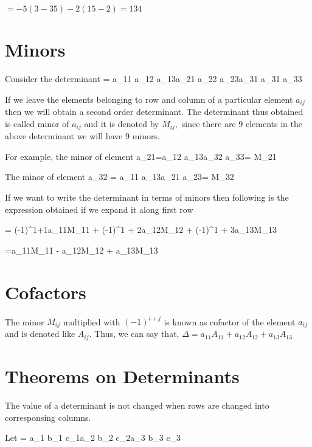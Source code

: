 $= -5(3 - 35) -2(15 -2) = 134$

\section{Minors}
Consider the determinant \startformula \Delta = \startdeterminant\NC a_{11} \NC a_{12} \NC a_{13}\NR\NC a_{21} \NC a_{22} \NC a_{23}\NR\NC a_{31} \NC a_{31} \NC
  a_{33}\NR\stopdeterminant\stopformula

If we leave the elements belonging to row and column of a particular element $a_{ij}$ then we will obtain a second order
determinant. The determinant thus obtained is called minor of $a_{ij}$ and it is denoted by $M_{ij},$ since there are $9$ elements
in the above determinant we will have $9$ minors.

For example, the minor of element \startformula a_{21}=\startdeterminant\NC a_{12} \NC a_{13}\NR\NC a_{32} \NC a_{33}\NR\stopdeterminant = M_{21}\stopformula

The minor of element \startformula a_{32} = \startdeterminant\NC a_{11} \NC a_{13}\NR\NC a_{21} \NC a_{23}\NR\stopdeterminant = M_{32}\stopformula

If we want to write the determinant in terms of minors then following is the expression obtained if we expand it along first row

\startformula \Delta = (-1)^{1+1}a_{11}M_{11} + (-1)^{1 + 2}a_{12}M_{12} + (-1)^{1 + 3}a_{13}M_{13}\stopformula

\startformula =a_{11}M_{11} - a_{12}M_{12} + a_{13}M_{13}\stopformula

\section{Cofactors}
The minor $M_{ij}$ multiplied with $(-1)^{i+j}$ is known as cofactor of the element $a_{ij}$ and is denoted like $A_{ij}$. Thus, we
can say that, $\Delta = a_{11}A_{11} + a_{12}A_{12} + a_{13}A_{13}$

\section{Theorems on Determinants}
\starttheorem
  The value of a determinant is not changed when rows are changed into corresponsing columns.
\stoptheorem

\startproof
Let \startformula \Delta = \startdeterminant\NC a_1 \NC b_1 \NC c_1\NR\NC a_2 \NC b_2 \NC c_2\NR\NC  a_3 \NC b_3 \NC c_3\NR\stopdeterminant\stopformula

